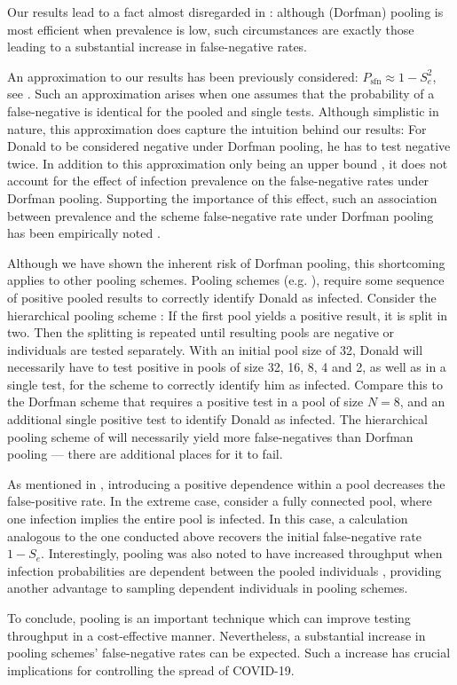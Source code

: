 \documentclass{article}
\newcommand{\Se}{S_e}
\newcommand{\mi}{P_{\text{sfn}}}
\begin{document}
Our results lead to a fact almost disregarded in \cite{DorfmanYuvalDor}: although (Dorfman) pooling is most efficient when prevalence is low, such circumstances are exactly those leading to a substantial increase in false-negative rates. 

An approximation to our results has been previously considered: $\mi \approx 1-\Se^2 $, see \cite{Simplistic1, Simplistic2, Kim, OptimalDorfmanPool}. Such an approximation arises when one assumes that the probability of a false-negative is identical for the pooled and single tests. Although simplistic in nature, this approximation does capture the intuition behind our results: For Donald to be considered negative under Dorfman pooling, he has to test negative twice. In addition to this approximation only being an upper bound \cite{Simplistic2}, it does not account for the effect of infection prevalence on the false-negative rates under Dorfman pooling. Supporting the importance of this effect, such an association between prevalence and the scheme false-negative rate under Dorfman pooling has been empirically noted  \cite{DorfmanYuvalDor}.

Although we have shown the inherent risk of Dorfman pooling, this shortcoming applies to other pooling schemes. Pooling schemes (e.g. \cite{MatrixPooling,Lion, Kim}), require some sequence of positive pooled results to correctly identify Donald as infected. Consider the hierarchical pooling scheme \cite{Lion, Kim}: If the first pool yields a positive result, it is split in two. Then the splitting is repeated until resulting pools are negative or individuals are tested separately. With an initial pool size of 32, Donald will necessarily have to test positive in pools of size 32, 16, 8, 4 and 2, as well as in a single test, for the scheme to correctly identify him as infected. Compare this to the Dorfman scheme that requires a positive test in a pool of size $N=8$, and an additional single positive test to identify Donald as infected. The hierarchical pooling scheme of \cite{Lion, Kim} will necessarily yield  more false-negatives than Dorfman pooling --- there are additional places for it to fail.

As mentioned in \cite{DorfmanYuvalDor}, introducing a positive dependence within a pool decreases the false-positive rate. In the extreme case, consider a fully connected pool, where one infection implies the entire pool is infected. In this case, a calculation analogous to the one conducted above recovers the initial false-negative rate $1-\Se$. Interestingly, pooling was also noted to have increased throughput when infection probabilities are dependent between the pooled individuals \cite{DorfmanYuvalDor}, providing  another advantage to sampling dependent individuals in pooling schemes.  

To conclude, pooling is an important technique which can improve testing throughput in a cost-effective manner. Nevertheless, a substantial increase in pooling schemes' false-negative rates can be expected. Such a increase has crucial implications for controlling the spread of COVID-19.






\end{document}
